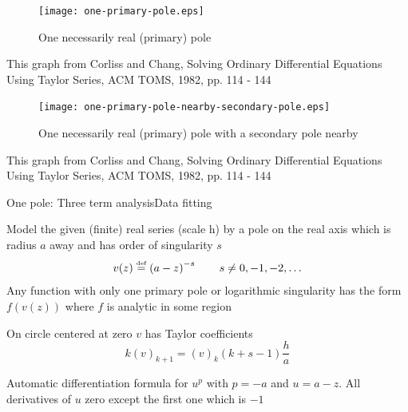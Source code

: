 \documentclass[11pt,svgnames,fleqn]{beamer}
\newcommand{\DM}[1]{\begin{displaymath} {#1} \end{displaymath}}
\newcommand{\defeq}{\stackrel{\textup{\tiny def}}{=}}
\newcommand{\parbg}[1]{\left(  {#1} \right)}
\newcommand{\tc}[2]{(#1)_{#2}}
\begin{document}
  
\begin{frame}

\begin{figure}
  \centering
  \vspace{-0.4cm}
  \texttt{[image: one-primary-pole.eps]} %
  \caption{One necessarily real (primary) pole}
\end{figure}

  {\footnotesize This graph from Corliss and Chang, Solving Ordinary Differential Equations 
  Using Taylor Series, ACM TOMS, 1982, pp. 114 - 144}
\end{frame}

\begin{frame}

\begin{figure}
  \centering
  \vspace{-0.4cm}
  \texttt{[image: one-primary-pole-nearby-secondary-pole.eps]} %
  \caption{One necessarily real (primary) pole with a secondary pole nearby}
\end{figure}

  {\footnotesize This graph from Corliss and Chang, Solving Ordinary Differential Equations 
  Using Taylor Series, ACM TOMS, 1982, pp. 114 - 144}
\end{frame}

\begin{frame}{One pole: Three term analysis}{Data fitting}

  Model the given (finite) real series (scale h) by a pole on the real axis which is radius $a$ away
  and has order of singularity $s$
  \DM
  {
    v(z) \defeq \parbg{a-z}^{-s}  \qquad s \neq 0, -1, -2, \ldots
  }
  Any function with only one primary pole or logarithmic singularity
  has the form $f(v(z))$ where $f$ is analytic in some region

  \vspace{2mm}

  On circle centered at zero $v$ has Taylor coefficients 
  \DM
  {
    k \tc{v}{k+1} = \tc{v}{k}\parbg{k+s-1}\frac{h}{a}
  }
 
  Automatic differentiation formula for $u^p$ with $p=-a$ and $u=a-z$. All derivatives of $u$ zero
  except the first one which is $-1$
\end{frame}
\end{document}
